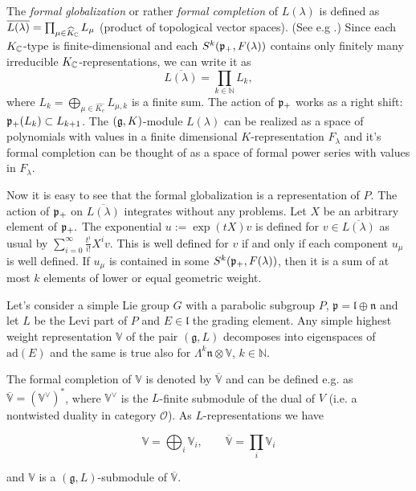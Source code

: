 The \emph{formal globalization} or rather \emph{formal completion} of $L(\lambda)$ is defined as   $\overline{L(\lambda)}=\prod_{\mu\in \widehat{K}_{\mathbb{C}}} L_\mu$ (product of topological vector spaces). (See e.g \cite{vogan_unitary_2008}.) Since each $K_{\mathbb{C}}$-type is finite-dimensional and each $S^k(\mathfrak{p}_+,F(\lambda))$ contains only finitely many irreducible $K_{\mathbb{C}}$-representations, we can write it as
\[\overline{L(\lambda)} = \prod_{k\in\mathbb{N}} L_k,\] %
where $L_k = \bigoplus_{\mu\in\widehat{K_c}} L_{\mu,k}$ is a finite sum. The action of $\mathfrak{p}_+$ works as a right shift: $\mathfrak{p}_+(L_k)\subset L_{k+1}$. The $(\mathfrak{g},K)$-module $L(\lambda)$ can be realized as a space of polynomials with values in a finite dimensional $K$-representation $F_\lambda$ and it's formal completion can be thought of as a space of formal power series with values in $F_\lambda$. %

Now it is easy to see that the formal globalization  is a representation of $P$. The action of $\mathfrak{p}_+$ on $\overline{L(\lambda)}$ integrates without any problems. Let $X$ be an arbitrary element of $\mathfrak{p}_+.$ The exponential $u:=\exp(tX)v$ is defined for $v\in\overline{L(\lambda)}$ as usual by $\sum_{i=0}^\infty \frac{t^i}{i!} X^iv$. This is well defined for $v$ if and only if each component $u_\mu$ is well defined. If $u_\mu$ is contained in some $S^k(\mathfrak{p}_+,F(\lambda))$, then it is a sum of at most $k$ elements of lower or equal geometric weight.



Let's consider a simple Lie group $G$ with a parabolic subgroup $P$, $\mathfrak{p} = \mathfrak{l}\oplus\mathfrak{n}$ and let $L$ be the Levi part of $P$ and $E\in \mathfrak{l}$ the grading element. Any simple highest weight representation  $\mathbb{V}$ of the pair $(\mathfrak{g},L)$ decomposes into eigenspaces of $\mathrm{ad}(E)$ and the same is true also for $\Lambda^k\mathfrak{n}\otimes\mathbb{V}$, $k\in \mathbb{N}$.

The formal completion of $\mathbb{V}$ is denoted by $\overline{\mathbb{V}}$ and can be defined e.g. as $\overline{\mathbb{V}} = (\mathbb{V}^\vee)^*$, where $\mathbb{V}^\vee$ is the $L$-finite submodule of the dual of $V$ (i.e. a nontwisted duality  in category $\mathcal{O}$). As $L$-representations we have

$$
\mathbb{V} = \bigoplus_i \mathbb{V}_i, \qquad \overline{\mathbb{V}}  = \prod_i \mathbb{V}_i
$$

and $\mathbb{V}$ is a $(\mathfrak{g},L)$-submodule of $\overline{\mathbb{V}}$.

